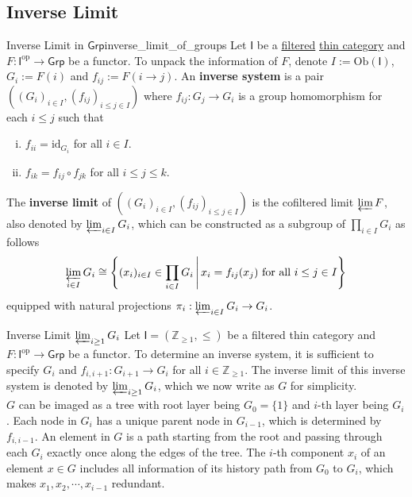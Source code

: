 \subsection{Inverse Limit}
\begin{definition}{Inverse Limit in $\mathsf{Grp}$}{inverse_limit_of_groups}
    Let $\mathsf{I}$ be a \hyperref[th:filtered_category]{filtered} \hyperref[th:thin_category]{thin category} and $F:\mathsf{I}^{\mathrm{op}}\to \mathsf{Grp}$ be a functor. To unpack the information of $F$, denote $I:=\mathrm{Ob}(\mathsf{I})$, $G_i:=F(i)$ and $f_{ij}:=F(i\to j)$. An \textbf{inverse system} is a pair $\left(\left(G_i\right)_{i \in I},\left(f_{i j}\right)_{i \leq j \in I}\right)$ where $f_{i j}: G_{j} \rightarrow G_{i}$ is a group homomorphism for each $i \leq j$ such that
    \begin{enumerate}[(i)]
        \item $f_{i i}=\mathrm{id}_{G_i}$ for all $i \in I$.
        \item $f_{i k}=f_{i j} \circ f_{j k}$ for all $i \leq j \leq k$.
    \end{enumerate}
    The \textbf{inverse limit} of $\left(\left(G_i\right)_{i \in I},\left(f_{i j}\right)_{i \leq j \in I}\right)$ is the cofiltered limit $\varprojlim F$, also denoted by $\varprojlim_{i\in I}G_i$, which can be constructed as a subgroup of $\prod_{i \in I} G_{i}$ as follows
    \[
        \varprojlim_{i\in I}G_i \cong \left\{(x_i)_{i\in I}\in \prod_{i \in I} G_{i}\,\middle\vert\, x_i=f_{ij}(x_j) \text{ for all }i\le j \in I\right\}
    \]
    equipped with natural projections $\pi_i:\varprojlim_{i\in I}G_i\to G_i$.\\

\end{definition}


\begin{example}{Inverse Limit $\varprojlim_{i\ge 1}G_i$}{}
    Let $\mathsf{I}=\left(\mathbb{Z}_{\ge 1},\le\right)$ be a filtered thin category and $F:\mathsf{I}^{\mathrm{op}}\to \mathsf{Grp}$ be a functor. To determine an inverse system, it is sufficient to specify $G_i$ and $f_{i,i+1}:G_{i+1}\to G_i$ for all $i\in \mathbb{Z}_{\ge 1}$. The inverse limit of this inverse system is denoted by $\varprojlim_{i\ge 1}G_i$, which we now write as $G$ for simplicity.\\
    $G$ can be imaged as a tree with root layer being $G_0=\{1\}$ and $i$-th layer being $G_i$. Each node in $G_i$ has a unique parent node in $G_{i-1}$, which is determined by $f_{i,i-1}$. An element in $G$ is a path starting from the root and passing through each $G_i$ exactly once along the edges of the tree. The $i$-th component $x_i$ of an element $x\in G$ includes all information of its history path from $G_0$ to $G_i$, which makes $x_1,x_2,\cdots, x_{i-1}$ redundant.
\end{example}


